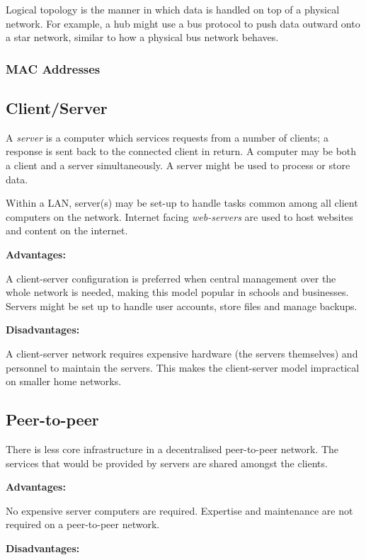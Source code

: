 \documentclass[10pt]{article}
\begin{document}
Logical topology is the manner in which data is handled on top of a physical network. For example, a hub might use a bus protocol to push data outward onto a star network, similar to how a physical bus network behaves.

\subsubsection{MAC Addresses}
\label{sec:org09b65e9}
\subsection{Client/Server}
\label{sec:orgc580c6e}

A \emph{server} is a computer which services requests from a number of clients; a response is sent back to the connected client in return. A computer may be both a client and a server simultaneously. A server might be used to process or store data.

Within a LAN, server(s) may be set-up to handle tasks common among all client computers on the network. Internet facing \emph{web-servers} are used to host websites and content on the internet.

\textbf{Advantages:}

A client-server configuration is preferred when central management over the whole network is needed, making this model popular in schools and businesses. Servers might be set up to handle user accounts, store files and manage backups.

\textbf{Disadvantages:}

A client-server network requires expensive hardware (the servers themselves) and personnel to maintain the servers. This makes the client-server model impractical on smaller home networks.

\subsection{Peer-to-peer}
\label{sec:org832b63f}

There is less core infrastructure in a decentralised peer-to-peer network. The services that would be provided by servers are shared amongst the clients.

\textbf{Advantages:}

No expensive server computers are required. Expertise and maintenance are not required on a peer-to-peer network.

\textbf{Disadvantages:}
\end{document}
